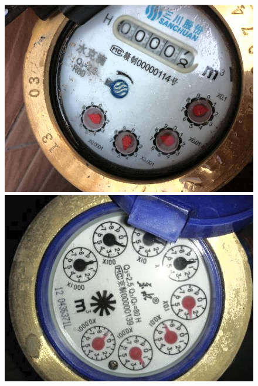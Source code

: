 \documentclass[a4paper]{ctexart}
\begin{document}
\begin{figure}[htbp]
\begin{minipage}[t]{0.25\textwidth}
		\includegraphics[width=\textwidth]{figure/equalizeHist/img3.jpg}
	\end{minipage}
	\begin{minipage}[t]{0.25\textwidth}
		\centering
		\includegraphics[width=\textwidth]{figure/equalizeHist/img4.jpg}
	\end{minipage}
	\begin{minipage}[t]{0.25\textwidth}
		\centering

\end{minipage}
\end{figure}
\end{document}
